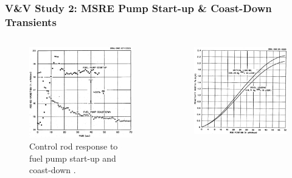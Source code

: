 \begin{frame}
  \frametitle{V\&V Study 2: MSRE Pump Start-up \& Coast-Down Transients}
  \begin{columns}
    \column[t]{4cm}
    \begin{figure}
      \centering
      \includegraphics[width=.9\columnwidth]{../images/msre-transient}
      \caption{Control rod response to fuel pump start-up and coast-down
      \cite{prince_zero-power_1968}.}
    \end{figure}
    \hfill
    \column[t]{4cm}
    \begin{figure}
      \centering
      \includegraphics[width=.9\columnwidth]{../images/msre-rod-worth}

\end{figure}
\end{columns}
\end{frame}
